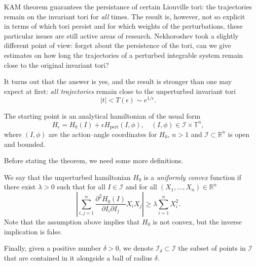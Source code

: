 \documentclass[english,fontsize=11pt,paper=b5]{scrbook}
\numberwithin{equation}{chapter}
\theoremstyle{definition}
\begin{document}
      KAM theorem guarantees the persistance of certain Liouville tori: the trajectories remain on the invariant tori for \emph{all} times. The result is, however, not so explicit in terms of which tori persist and for which weights of the perturbations, these particular issues are still active areas of research.
      Nekhoroshev took a slightly different point of view: forget about the persistence of the tori, can we give estimates on how long the trajectories of a perturbed integrable system remain close to the original invariant tori?

      It turns out that the answer is yes, and the result is stronger than one may expect at first: \emph{all trajectories} remain close to the unperturbed invariant tori 
      \begin{equation}
        |t| < T(\epsilon) \sim e^{1/\epsilon}.
      \end{equation}

      The starting point is an analytical hamiltonian of the usual form
      \begin{equation}\label{eq:hamneko}
        H_\epsilon = H_0(I) + \epsilon H_{\mathrm{pert}}(I, \phi), \quad (I,\phi)\in \mathcal{I}\times\mathbb{T}^n,
      \end{equation}
      where $(I,\phi)$ are the action--angle coordinates for $H_0$, $n>1$ and $\mathcal{I}\subset\mathbb{R}^n$ is open and bounded.

      Before stating the theorem, we need some more definitions.

      We say that the unperturbed hamiltonian $H_0$ is a \emph{uniformly convex} function if there exist $\lambda >0$ such that for all $I\in\mathcal{I}$ and for all $(X_1, \ldots, X_n)\in\mathbb{R}^n$
      \begin{equation}
        \left| \sum_{i,j=1}^n \frac{\partial^2 H_0(I)}{\partial I_i \partial I_j} X_i X_j\right| \geq \lambda \sum_{i=1}^n X_i^2.
      \end{equation}
      Note that the assumption above implies that $H_0$ is not convex, but the inverse implication is false.

      Finally, given a positive number $\delta >0$, we denote $\mathcal{I}_\delta \subset\mathcal{I}$ the subset of points in $\mathcal{I}$ that are contained in it alongside a ball of radius $\delta$.
\end{document}
